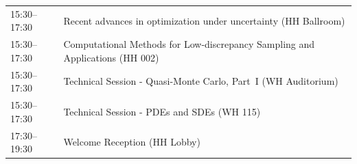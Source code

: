 \documentclass[12pt,lettersize,oneside]{book} %
\begin{document}
\begin{table}
{\begin{tabularx}{\textwidth}{>{\hsize=0.32\hsize}X|>{\hsize=1.7\hsize}X}
\cellcolor{\SessionTitleColor}15:30--17:30 & \cellcolor{\SessionTitleColor}Recent advances in optimization under uncertainty (HH Ballroom) \\
\cellcolor{\SessionTitleColor}15:30--17:30 & \cellcolor{\SessionTitleColor}Computational Methods for Low-discrepancy Sampling and Applications (HH 002) \\
\cellcolor{\SessionLightColor}15:30--17:30 & \cellcolor{\SessionLightColor}Technical Session - Quasi-Monte Carlo, Part~I (WH Auditorium) \\
\cellcolor{\SessionLightColor}15:30--17:30 & \cellcolor{\SessionLightColor}Technical Session - PDEs and SDEs (WH 115) \\
\cellcolor{\EmptyColor}17:30--19:30 & \cellcolor{\EmptyColor}Welcome Reception (HH Lobby) \\
\hline
\end{tabularx}
}
\end{table}
\end{document}
